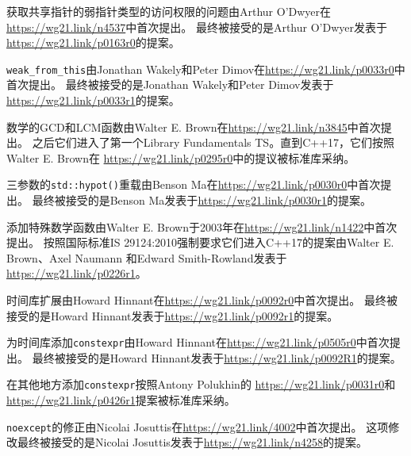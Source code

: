 获取共享指针的弱指针类型的访问权限的问题由Arthur O’Dwyer在\url{https://wg21.link/n4537}中首次提出。
最终被接受的是Arthur O’Dwyer发表于\url{https://wg21.link/p0163r0}的提案。

\texttt{weak\_from\_this}由Jonathan Wakely和Peter Dimov在\url{https://wg21.link/p0033r0}中首次提出。
最终被接受的是Jonathan Wakely和Peter Dimov发表于\url{https://wg21.link/p0033r1}的提案。

数学的GCD和LCM函数由Walter E. Brown在\url{https://wg21.link/n3845}中首次提出。
之后它们进入了第一个Library Fundamentals TS。直到C++17，它们按照Walter E. Brown在
\url{https://wg21.link/p0295r0}中的提议被标准库采纳。

三参数的\texttt{std::hypot()}重载由Benson Ma在\url{https://wg21.link/p0030r0}中首次提出。
最终被接受的是Benson Ma发表于\url{https://wg21.link/p0030r1}的提案。

添加特殊数学函数由Walter E. Brown于2003年在\url{https://wg21.link/n1422}中首次提出。
按照国际标准IS 29124:2010强制要求它们进入C++17的提案由Walter E. Brown、Axel Naumann
和Edward Smith-Rowland发表于\url{https://wg21.link/p0226r1}。

时间库扩展由Howard Hinnant在\url{https://wg21.link/p0092r0}中首次提出。
最终被接受的是Howard Hinnant发表于\url{https://wg21.link/p0092r1}的提案。

为时间库添加\texttt{constexpr}由Howard Hinnant在\url{https://wg21.link/p0505r0}中首次提出。
最终被接受的是Howard Hinnant发表于\url{https://wg21.link/p0092R1}的提案。

在其他地方添加\texttt{constexpr}按照Antony Polukhin的
\url{https://wg21.link/p0031r0}和\url{https://wg21.link/p0426r1}提案被标准库采纳。

\texttt{noexcept}的修正由Nicolai Josuttis在\url{https://wg21.link/4002}中首次提出。
这项修改最终被接受的是Nicolai Josuttis发表于\url{https://wg21.link/n4258}的提案。